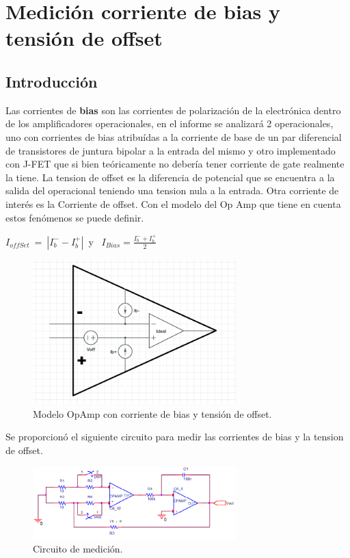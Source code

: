 
\section{Medici\'on corriente de bias y tensi\'on de offset}

\subsection{Introducción}
Las corrientes de \textbf{bias} son las corrientes de polarización de la electrónica dentro de los amplificadores operacionales, en el informe se analizará 2 operacionales, uno con corrientes de bias atribuídas a la corriente de base de un par diferencial de transistores de juntura bipolar a la entrada del mismo y otro implementado con J-FET que si bien teóricamente no debería tener corriente de gate realmente la tiene.
La tension de offset es la diferencia de potencial que se encuentra a la salida del operacional teniendo una tension nula a la entrada.
Otra corriente de interés es la Corriente de offset.
Con el modelo del Op Amp que tiene en cuenta estos fenómenos se puede definir.\newline
 	
 $I_{offSet} \ = \ |I_b^{-}-I_b^{+}|$\ y \ $I_{Bias}= \frac{I_b^-+I_b^{+}}{2}$
\begin{figure}[H]	
	\centering
	\includegraphics[width=0.7\textwidth]{Ej3/imagenes/opampReal.PNG}
	\caption{Modelo OpAmp con corriente de bias y tensión de offset.}
	\label{fig:OpampBias}
\end{figure}



Se proporcionó el siguiente circuito para medir las corrientes de bias y la tension de offset.

\begin{figure}[H]	
	\centering
	\includegraphics[width=0.7\textwidth]{Ej3/imagenes/CircMedicion.PNG}
	\caption{Circuito de medición.}
	\label{fig:CircMedicion}
\end{figure}

